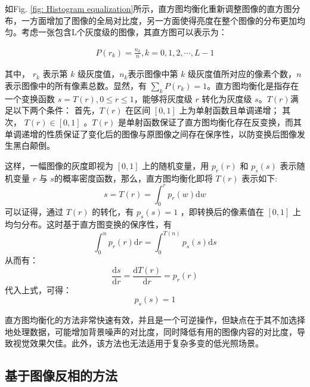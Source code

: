 \documentclass[letterpaper,10pt]{article}
\begin{document}
		如Fig. \ref{fig: Histogram equalization}所示，直方图均衡化重新调整图像的直方图分布，一方面增加了图像的全局对比度，另一方面使得亮度在整个图像的分布更加均匀。考虑一张包含L个灰度级的图像，其直方图可以表示为：
		
		\begin{equation}
			\begin{aligned}
				P(r_k) = \frac{n_k}{n}, k=0, 1, 2, \cdots, L-1
			\end{aligned}
			\label{eq: Histogram}
		\end{equation}
		
		其中， $r_k$ 表示第 $k$ 级灰度值，$n_k$表示图像中第 $k$ 级灰度值所对应的像素个数，$n$ 表示图像中的所有像素总数。显然，有 $\sum_{k} P(r_k)=1$。直方图均衡化是指存在一个变换函数 $s=T(r), 0 \leqslant r \leqslant 1$，能够将灰度级 $r$ 转化为灰度级 $s$。$T(r)$满足以下两个条件： 首先，$T(r)$ 在区间 $[0, 1]$ 上为单射函数且单调递增； 其次， $T(r) \in [0, 1]$ 。$T(r)$ 是单射函数保证了直方图均衡化存在反变换，而其单调递增的性质保证了变化后的图像与原图像之间存在保序性，以防变换后图像发生黑白颠倒。
		
		这样，一幅图像的灰度即视为 $[0,1]$ 上的随机变量，用 $p_r(r)$ 和 $p_s(s)$ 表示随机变量 $r$ 与 $s$的概率密度函数，那么，直方图均衡化即将 $T(r)$ 表示如下: $$s = T(r) = \int_{0}^{r} p_r(w) \mathrm{d}w$$ 可以证得，通过 $T(r)$ 的转化，有 $p_s(s) = 1$ ，即转换后的像素值在 $[0, 1]$ 上均匀分布。这时基于直方图变换的保序性，有 $$\int_{0}^{n} p_r(r) \mathrm{d}r = \int_{0}^{T(n)} p_s(s) \mathrm{d}s$$ 从而有： $$\frac{\mathrm{d}s}{\mathrm{d}r} = \frac{\mathrm{d}T(r)}{\mathrm{d}r} = p_r(r)$$ 代入上式，可得： $$p_s(s) = 1$$ 
		
		直方图均衡化的方法非常快速有效，并且是一个可逆操作，但缺点在于其不加选择地处理数据，可能增加背景噪声的对比度，同时降低有用的图像内容的对比度，导致视觉效果欠佳。此外，该方法也无法适用于复杂多变的低光照场景。
		
		\subsection{基于图像反相的方法}
		
\end{document}
